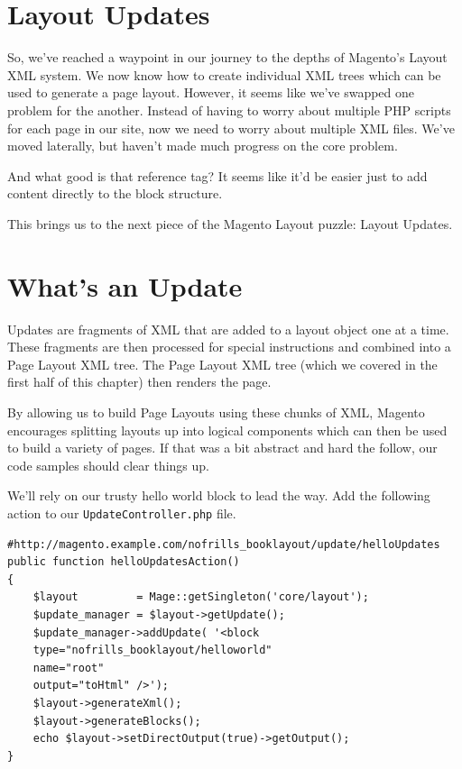 \documentclass[oneside]{book}
\begin{document}
\section{Layout Updates}

So, we've reached a waypoint in our journey to the depths of Magento's Layout XML system.  We now know how to create individual XML trees which can be used to generate a page layout.  However, it seems like we've swapped one problem for the another.  Instead of having to worry about multiple PHP scripts for each page in our site, now we need to worry about multiple XML files. We've moved laterally, but haven't made much progress on the core problem.

And what good is that reference tag?  It seems like it'd be easier just to add content directly to the block structure.

This brings us to the next piece of the Magento Layout puzzle:  Layout Updates.

\section{What's an Update}

Updates are fragments of XML that are added to a layout object one at a time.  These fragments are then processed for special instructions and combined into a Page Layout XML tree.  The Page Layout XML tree (which we covered in the first half of this chapter) then renders the page.  

By allowing us to build Page Layouts using these chunks of XML, Magento encourages splitting layouts up into logical components which can then be used to build a variety of pages. If that was a bit abstract and hard the follow, our code samples should clear things up.

We'll rely on our trusty hello world block to lead the way.  Add the following action to our \footnotesize\texttt{UpdateController.php} \normalsize  file.

\begin{lstlisting}
#http://magento.example.com/nofrills_booklayout/update/helloUpdates
public function helloUpdatesAction()
{
    $layout         = Mage::getSingleton('core/layout');
    $update_manager = $layout->getUpdate();         
    $update_manager->addUpdate( '<block
    type="nofrills_booklayout/helloworld" 
    name="root" 
    output="toHtml" />');           
    $layout->generateXml();
    $layout->generateBlocks();          
    echo $layout->setDirectOutput(true)->getOutput();                               
}

\end{lstlisting}
\end{document}
